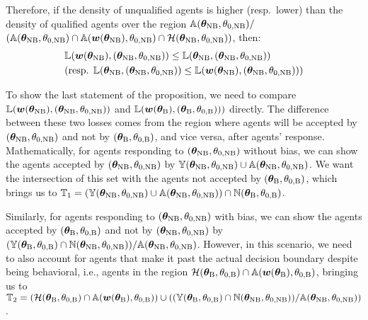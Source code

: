 Therefore, if the density of unqualified agents is higher (resp.~lower) than the density of qualified agents over the region ${\mathbb{A}}({\bm{\theta}}_\text{NB}, \theta_{0, \text{NB}})/$ $({\mathbb{A}}({\bm{\theta}}_\text{NB}, \theta_{0, \text{NB}})\cap {\mathbb{A}}({\bm{w}}({\bm{\theta}}_\text{NB}), \theta_{0, \text{NB}}) \cap\mathcal{H}({\bm{\theta}}_\text{NB}, \theta_{0, \text{NB}}))$, then:
\begin{align*}
    &{\mathbb{L}}({\bm{w}}({\bm{\theta}}_\text{NB}), ({\bm{\theta}}_\text{NB}, \theta_{0, \text{NB}}))\le {\mathbb{L}}({\bm{\theta}}_\text{NB}, ({\bm{\theta}}_\text{NB}, \theta_{0, \text{NB}})) \notag\\
    &(\text{resp. } {\mathbb{L}}({\bm{\theta}}_\text{NB}, ({\bm{\theta}}_\text{NB}, \theta_{0, \text{NB}}))\le {\mathbb{L}}({\bm{w}}({\bm{\theta}}_\text{NB}), ({\bm{\theta}}_\text{NB}, \theta_{0, \text{NB}})))
\end{align*}

To show the last statement of the proposition, we need to compare ${\mathbb{L}}({\bm{w}}({\bm{\theta}}_\text{NB}), ({\bm{\theta}}_\text{NB}, \theta_{0, \text{NB}}))$ and ${\mathbb{L}}({\bm{w}}({\bm{\theta}}_\text{B}), ({\bm{\theta}}_\text{B}, \theta_{0, \text{B}})))$ directly. The difference between these two losses comes from the region where agents will be accepted by $({\bm{\theta}}_\text{NB}, \theta_{0, \text{NB}})$ and not by $({\bm{\theta}}_\text{B}, \theta_{0, \text{B}})$, and vice versa, after agents' response. Mathematically, for agents responding to $({\bm{\theta}}_\text{NB}, \theta_{0, \text{NB}})$ without bias, we can show the agents accepted by $({\bm{\theta}}_\text{NB}, \theta_{0, \text{NB}})$ by ${\mathbb{Y}}({\bm{\theta}}_\text{NB}, \theta_{0,\text{NB}})\cup {\mathbb{A}}({\bm{\theta}}_\text{NB}, \theta_{0,\text{NB}})$. We want the intersection of this set with the agents not accepted by $({\bm{\theta}}_\text{B}, \theta_{0, \text{B}})$, which brings us to ${\mathbb{T}}_1=({\mathbb{Y}}({\bm{\theta}}_\text{NB}, \theta_{0,\text{NB}})\cup {\mathbb{A}}({\bm{\theta}}_\text{NB}, \theta_{0,\text{NB}}))\cap {\mathbb{N}}({\bm{\theta}}_\text{B}, \theta_{0,\text{B}})$. 

Similarly, for agents responding to $({\bm{\theta}}_\text{NB}, \theta_{0, \text{NB}})$ with bias, we can show the agents accepted by $({\bm{\theta}}_\text{B}, \theta_{0, \text{B}})$ and not by $({\bm{\theta}}_\text{NB}, \theta_{0, \text{NB}})$ by $({\mathbb{Y}}({\bm{\theta}}_\text{B}, \theta_{0,\text{B}}) \cap {\mathbb{N}}({\bm{\theta}}_\text{NB}, \theta_{0,\text{NB}}))/{\mathbb{A}}({\bm{\theta}}_\text{NB}, \theta_{0,\text{NB}})$. However, in this scenario, we need to also account for agents that make it past the actual decision boundary despite being behavioral, i.e., agents in the region $\mathcal{H}({\bm{\theta}}_\text{B}, \theta_{0,\text{B}})\cap {\mathbb{A}}({\bm{w}}({\bm{\theta}}_\text{B}), \theta_{0,\text{B}})$, bringing us to ${\mathbb{T}}_2 = (\mathcal{H}({\bm{\theta}}_\text{B}, \theta_{0,\text{B}})\cap {\mathbb{A}}({\bm{w}}({\bm{\theta}}_\text{B}), \theta_{0,\text{B}}))\cup ( ({\mathbb{Y}}({\bm{\theta}}_\text{B}, \theta_{0,\text{B}}) \cap {\mathbb{N}}({\bm{\theta}}_\text{NB}, \theta_{0,\text{NB}}))/{\mathbb{A}}({\bm{\theta}}_\text{NB}, \theta_{0,\text{NB}}) )$. 

